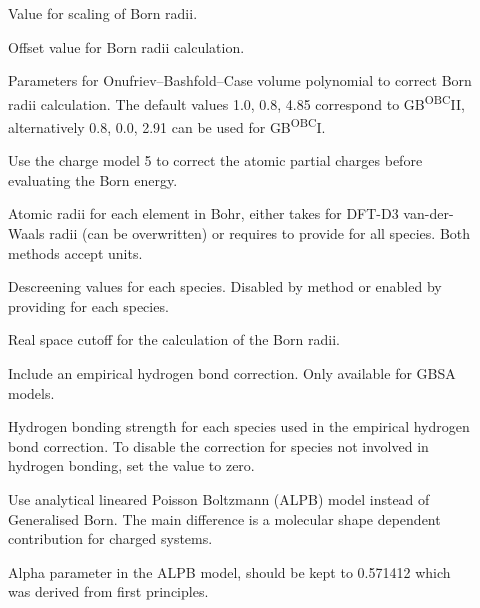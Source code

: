 \begin{description}
  \item[] Value for scaling of Born radii.

  \item[] 
    Offset value for Born radii calculation.

  \item[] Parameters for Onufriev--Bashfold--Case volume
    polynomial to correct Born radii calculation.
    The default values 1.0, 0.8, 4.85 correspond to GB\textsuperscript{OBC}II,
    alternatively 0.8, 0.0, 2.91 can be used for GB\textsuperscript{OBC}I.\cite{onufriev2004}

  \item[] Use the charge model 5 to correct the atomic partial charges
    before evaluating the Born energy.

  \item[] Atomic radii for each element in Bohr, either takes
     for DFT-D3 van-der-Waals radii (can be overwritten)
    or requires to provide  for all species.
    Both methods accept  units.

  \item[] Descreening values for each species.
    Disabled by  method or enabled by providing 
    for each species.

  \item[] 
    Real space cutoff for the calculation of the Born radii.

  \item[]
    Include an empirical hydrogen bond correction.
    Only available for GBSA models.

  \item[]
    Hydrogen bonding strength for each species used in the empirical hydrogen
    bond correction. To disable the correction for species not involved
    in hydrogen bonding, set the value to zero.

  \item[]
    Use analytical lineared Poisson Boltzmann (ALPB) model\cite{sigalov2006}
    instead of Generalised Born.
    The main difference is a molecular shape dependent contribution for charged
    systems.

  \item[]
    Alpha parameter in the ALPB model, should be kept to 0.571412 which was
    derived from first principles.\cite{sigalov2006}
\end{description}

